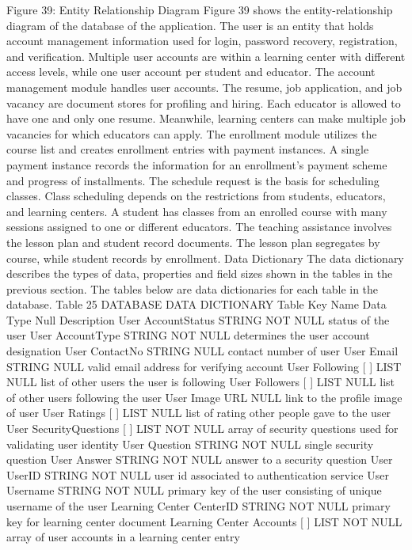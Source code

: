Figure 39: Entity Relationship Diagram
Figure 39 shows the entity-relationship diagram of the database of the application. The user is an entity that holds account management information used for login, password recovery, registration, and verification. Multiple user accounts are within a learning center with different access levels, while one user account per student and educator. The account management module handles user accounts.
The resume, job application, and job vacancy are document stores for profiling and hiring. Each educator is allowed to have one and only one resume. Meanwhile, learning centers can make multiple job vacancies for which educators can apply. 
The enrollment module utilizes the course list and creates enrollment entries with payment instances. A single payment instance records the information for an enrollment's payment scheme and progress of installments.
The schedule request is the basis for scheduling classes. Class scheduling depends on the restrictions from students, educators, and learning centers. A student has classes from an enrolled course with many sessions assigned to one or different educators. 
The teaching assistance involves the lesson plan and student record documents. The lesson plan segregates by course, while student records by enrollment. 
Data Dictionary
	The data dictionary describes the types of data, properties and field sizes shown in the tables in the previous section. The tables below are data dictionaries for each table in the database. 
Table 25
DATABASE DATA DICTIONARY
Table	Key Name	Data Type	Null	Description
User	AccountStatus	STRING	NOT NULL	status of the user
User	AccountType	STRING	NOT NULL	determines the user account designation
User	ContactNo	STRING	NULL	contact number of user
User	Email	STRING	NULL	valid email address for verifying account
User	Following [ ]	LIST	NULL	list of other users the user is following
User	Followers [ ]	LIST	NULL	list of other users following the user
User	Image	URL	NULL	link to the profile image of user
User	Ratings [ ]	LIST	NULL	list of rating other people gave to the user
User	SecurityQuestions [ ] { }	LIST	NOT NULL	array of security questions used for validating user identity
User	 	Question	STRING	NOT NULL	single security question
User		Answer	STRING	NOT NULL	answer to a security question
User	UserID	STRING	NOT NULL	user id associated to authentication service
User	Username	STRING	NOT NULL	primary key of the user consisting of unique username of the user
Learning Center	CenterID	STRING	NOT NULL	primary key for learning center document
Learning Center	Accounts [ ] { }	LIST	NOT NULL	array of user accounts in a learning center entry
